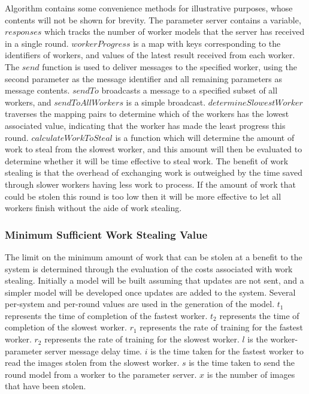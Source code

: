 \documentclass[12pt]{article}
\begin{document}
Algorithm contains some convenience methods for illustrative purposes, whose contents will not be shown for brevity. The parameter server contains a variable, $responses$ which tracks the number of worker models that the server has received in a single round. $workerProgress$ is a map with keys corresponding to the identifiers of workers, and values of the latest result received from each worker.
\newline
The $send$ function is used to deliver messages to the specified worker, using the second parameter as the message identifier and all remaining parameters as message contents. $sendTo$ broadcasts a message to a specified subset of all workers, and $sendToAllWorkers$ is a simple broadcast.
\newline
$determineSlowestWorker$ traverses the mapping pairs to determine which of the workers has the lowest associated value, indicating that the worker has made the least progress this round. $calculateWorkToSteal$
is a function which will determine the amount of work to steal from the slowest worker, and this amount will then be evaluated to determine whether it will be time effective to steal work. The benefit of work stealing is that the overhead of exchanging work is outweighed by the time saved through slower workers having less work to process. If the amount of work that could be stolen this round is too low then it will be more effective to let all workers finish without the aide of work stealing.

\subsubsection{Minimum Sufficient Work Stealing Value}
The limit on the minimum amount of work that can be stolen at a benefit to the system is determined through the evaluation of the costs associated with work stealing. Initially a model will be built assuming that updates are not sent, and a simpler model will be developed once updates are added to the system.
\newline
Several per-system and per-round values are used in the generation of the model.
$t_1$ represents the time of completion of the fastest worker.
$t_2$ represents the time of completion of the slowest worker.
$r_1$ represents the rate of training for the fastest worker.
$r_2$ represents the rate of training for the slowest worker.
$l$ is the worker-parameter server message delay time.
$i$ is the time taken for the fastest worker to read the images stolen from the slowest worker.
$s$ is the time taken to send the round model from a worker to the parameter server.
$x$ is the number of images that have been stolen.
\end{document}
